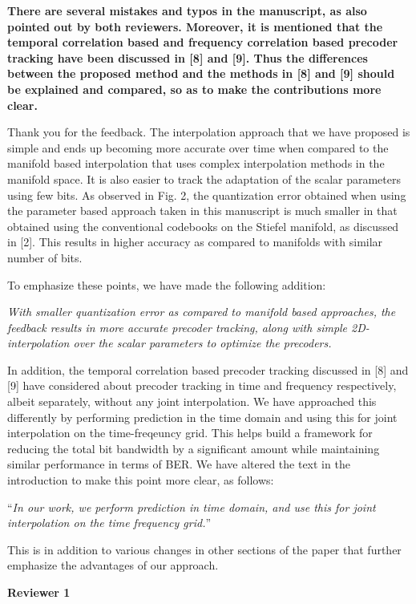 \documentclass[12pt]{letter}
\begin{document}
\textbf{There are several mistakes and typos in the manuscript, as
  also pointed out by both reviewers. Moreover, it is mentioned that
  the temporal correlation based and frequency correlation based
  precoder tracking have been discussed in [8] and [9]. Thus the
  differences between the proposed method and the methods in [8] and
  [9] should be explained and compared, so as to make the
  contributions more clear.}

Thank you for the feedback. The interpolation approach that we have
proposed is simple and ends up becoming more accurate over time when
compared to the manifold based interpolation that uses complex
interpolation methods in the manifold space. It is also easier to
track the adaptation of the scalar parameters using few bits. As
observed in Fig. 2, the quantization error obtained when using the
parameter based approach taken in this manuscript is much smaller in
that obtained using the conventional codebooks on the Stiefel
manifold, as discussed in [2]. This results in higher accuracy as
compared to manifolds with similar number of bits.

To emphasize these points, we have made the following addition:

\emph{With smaller
quantization error as compared to manifold based approaches, the
feedback results in more accurate precoder tracking, along with simple
2D-interpolation over the scalar parameters to optimize the precoders.}


In addition, the temporal correlation based precoder tracking
discussed in [8] and [9] have considered about precoder tracking in
time and frequency respectively, albeit separately, without any joint
interpolation.  We have approached this differently by performing
prediction in the time domain and using this for joint interpolation
on the time-freqeuncy grid. This helps build a framework for reducing
the total bit bandwidth by a significant amount while maintaining
similar performance in terms of BER.  We have altered the text in the
introduction to make this point more clear, as follows:

``\emph{In our work, we perform prediction in time domain, and use this for joint
  interpolation on the time frequency grid.}''

This is in addition to various changes in other sections of the paper
that further emphasize the advantages of our approach.

\textbf{Reviewer 1}\\
\end{document}
